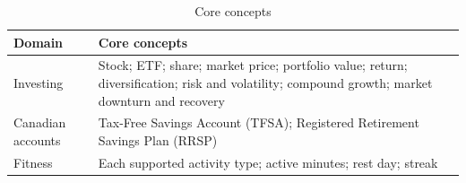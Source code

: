 \documentclass[12pt]{article}
\begin{document}
\begin{table}[H]
\caption{Core concepts} \label{TblCoreConcepts}
\small
\begin{tabularx}{\textwidth}{>{\raggedright\arraybackslash}p{}X}
\toprule
\textbf{Domain} & \textbf{Core concepts}\\
\midrule
Investing & Stock; ETF; share; market price; portfolio value; return;
diversification; risk and volatility; compound growth; market downturn and
recovery\\
Canadian accounts & Tax-Free Savings Account (TFSA); Registered Retirement
Savings Plan (RRSP)\\
Fitness & Each supported activity type; active minutes; rest day;
streak\\
\bottomrule
\end{tabularx}
\end{table}
\end{document}
